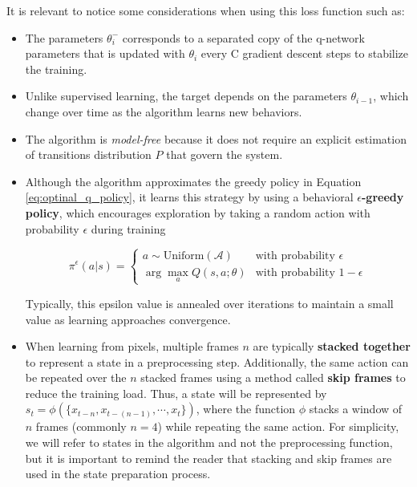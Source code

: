 It is relevant to notice some considerations when using this loss function such as:

\begin{itemize}
    \item The parameters $\theta^-_{i}$ corresponds to a separated copy of the q-network parameters that is updated with $\theta_{i}$ every C gradient descent steps to stabilize the training.
    \item Unlike supervised learning, the target depends on the parameters $\theta_{i-1}$, which change over time as the algorithm learns new behaviors.
    \item The algorithm is \textit{model-free} because it does not require an explicit estimation of transitions distribution $P$ that govern the system.
    \item Although the algorithm approximates the greedy policy in Equation \ref{eq:optinal_q_policy}, it learns this strategy by using a behavioral \textbf{$\epsilon$-greedy policy}, which encourages exploration by taking a random action with probability $\epsilon$ during training 

    \begin{equation}
        \pi^\epsilon(a | s) = 
        \begin{cases} 
        a \sim \text{Uniform}(\mathcal{A}) & \text{with probability } \epsilon \\
        \arg\max_{a} Q(s, a; \theta) & \text{with probability } 1 - \epsilon
        \end{cases}
    \end{equation}
    
    Typically, this epsilon value is annealed over iterations to maintain a small value as learning approaches convergence.
    \item When learning from pixels, multiple frames $n$ are typically \textbf{stacked together} to represent a state in a preprocessing step. Additionally, the same action can be repeated over the $n$ stacked frames using a method called \textbf{skip frames} to reduce the training load. Thus, a state will be represented by $s_{t} = \phi(\{x_{t-n}, x_{t-(n-1)}, \cdots, x_{t}\})$, where the function $\phi$ stacks a window of $n$ frames (commonly $n=4$) while repeating the same action. For simplicity, we will refer to states in the algorithm and not the preprocessing function, but it is important to remind the reader that stacking and skip frames are used in the state preparation process.
\end{itemize}

